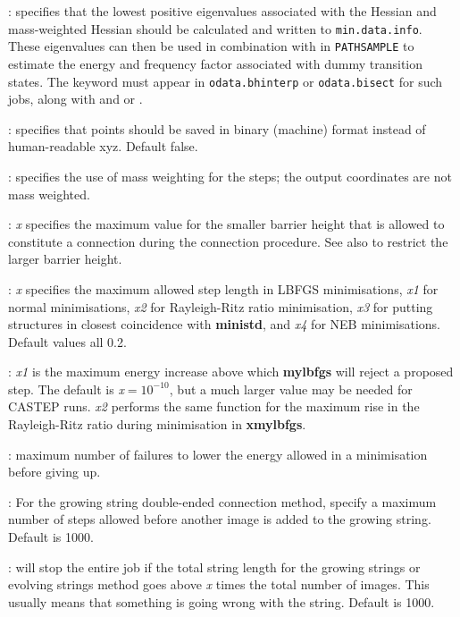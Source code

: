 {{: specifies that the lowest positive eigenvalues associated
with the Hessian and mass-weighted Hessian should be calculated and written to {\tt min.data.info\/}.
These eigenvalues can then be used in combination with {\/} in {\tt PATHSAMPLE}
to estimate the energy and frequency factor associated with dummy transition states.
The {} keyword must appear in {\tt odata.bhinterp} or {\tt odata.bisect} for
such jobs, along with {} and {} or {}.

: specifies that points should be saved in binary (machine) format instead 
of human-readable xyz. Default false.

: specifies the use of mass weighting for the steps; the 
output coordinates are not mass weighted.

: {\it x\/} specifies the maximum value for the smaller barrier height that 
is allowed to constitute a connection during the
{ \/}connection procedure.
See also {} to restrict the larger barrier height.

: {\it x\/} specifies the maximum allowed step length in LBFGS
minimisations, {\it x1\/} for  normal minimisations, {\it x2\/} for Rayleigh-Ritz ratio
minimisation, {\it x3\/} for putting structures in closest coincidence with
{\bf ministd}, and {\it x4\/} for NEB minimisations. Default values all 0.2.

: {\it x1} is the maximum energy increase above which
{\bf mylbfgs} will reject a proposed step. The default is {\it x}$=10^{-10}$, but
a much larger value may be needed for CASTEP runs.
{\it x2\/} performs the same function for the maximum rise in the Rayleigh-Ritz ratio
during minimisation in {\bf xmylbfgs}.

: maximum number of failures 
to lower the energy allowed in a minimisation before giving up.

: For the growing string double-ended connection
  method, specify a maximum number of steps allowed before another image is
  added to the growing string. Default is 1000. 

: will stop the entire job if the total string
  length for the growing strings or evolving strings method goes above {\it x}
  times the total number of images. This usually means that something is going
  wrong with the string. Default is 1000. 

}}
